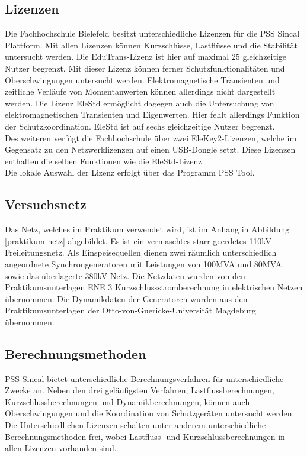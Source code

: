 \documentclass{scrartcl}
\begin{document}
\begin{onehalfspace}
\subsection{Lizenzen}
Die Fachhochschule Bielefeld besitzt unterschiedliche Lizenzen für die PSS Sincal Plattform. Mit allen Lizenzen können Kurzschlüsse, Lastflüsse und die Stabilität untersucht werden. Die EduTrans-Lizenz ist hier auf maximal 25 gleichzeitige Nutzer begrenzt. Mit dieser Lizenz können ferner Schutzfunktionalitäten und Oberschwingungen untersucht werden. Elektromagnetische Transienten und zeitliche Verläufe von Momentanwerten können allerdings nicht dargestellt werden. Die Lizenz EleStd ermöglicht dagegen auch die Untersuchung von elektromagnetischen Transienten und Eigenwerten. Hier fehlt allerdings Funktion der Schutzkoordination. EleStd ist auf sechs gleichzeitige Nutzer begrenzt. \\
Des weiteren verfügt die Fachhochschule über zwei EleKey2-Lizenzen, welche im Gegensatz zu den Netzwerklizenzen auf einen USB-Dongle setzt. Diese Lizenzen enthalten die selben Funktionen wie die EleStd-Lizenz. \\
Die lokale Auswahl der Lizenz erfolgt über das Programm \glqq PSS Tool\grqq.

\subsection{Versuchsnetz}
Das Netz, welches im Praktikum verwendet wird, ist im Anhang in Abbildung \ref{praktikum-netz} abgebildet. Es ist ein vermaschtes starr geerdetes 110kV-Freileitungsnetz. Als Einspeisequellen dienen zwei räumlich unterschiedlich angeordnete Synchrongeneratoren mit Leistungen von 100MVA und 80MVA, sowie das überlagerte 380kV-Netz. Die Netzdaten wurden von den Praktikumsunterlagen \glqq ENE 3 Kurzschlussstromberechnung in elektrischen Netzen\grqq{} übernommen. Die Dynamikdaten der Generatoren wurden aus den Praktikumsunterlagen der Otto-von-Guericke-Universität Magdeburg übernommen.

\subsection{Berechnungsmethoden}
PSS Sincal bietet unterschiedliche Berechnungsverfahren für unterschiedliche Zwecke an. Neben den drei geläufigsten Verfahren, Lastflussberechnungen, Kurzschlussberechnungen und Dynamikberechnungen, können auch Oberschwingungen und die Koordination von Schutzgeräten untersucht werden. Die Unterschiedlichen Lizenzen schalten unter anderem unterschiedliche Berechnungsmethoden frei, wobei Lastfluss- und Kurzschlussberechnungen in allen Lizenzen vorhanden sind.


\end{onehalfspace}
\end{document}
